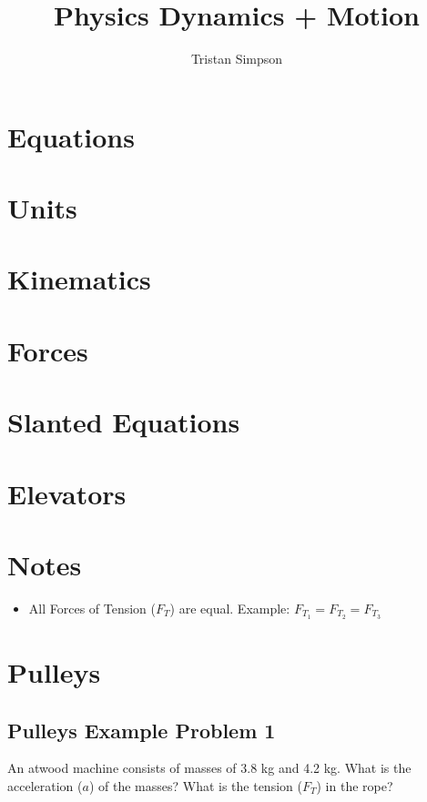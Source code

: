 \documentclass{article}
\title{Physics Dynamics + Motion}
\author{Tristan Simpson}
\begin{document}
\maketitle

\section{Equations}

\section{Units}

\section{Kinematics}

\section{Forces}

\section{Slanted Equations}

\section{Elevators}

\section{Notes}
\begin{itemize}
    \item All Forces of Tension ($F_T$) are equal. Example: $F_{T_1} = F_{T_2} = F_{T_3}$
\end{itemize}

\section{Pulleys}
\subsection{Pulleys Example Problem 1}
An atwood machine consists of masses of 3.8 kg and 4.2 kg. What is the acceleration ($a$) of the masses? What is the tension ($F_T$) in the rope?
\end{document}
